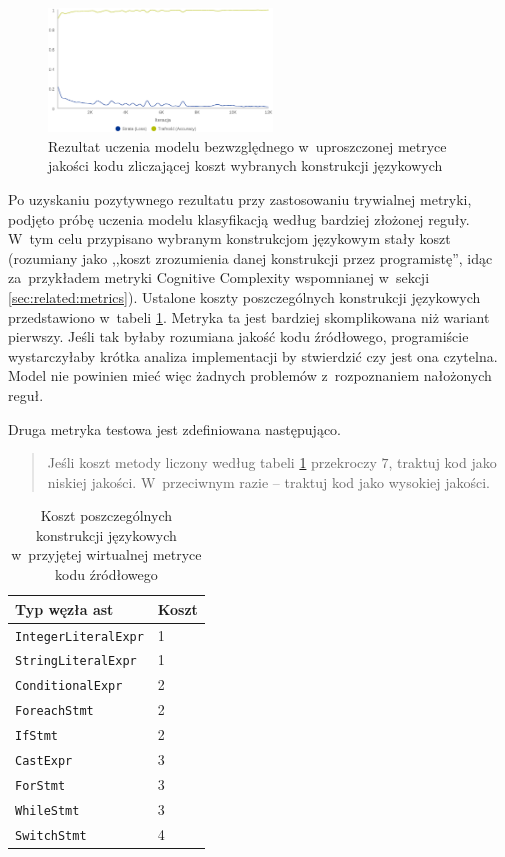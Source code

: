 \documentclass[twoside]{praca}
\begin{document}
\begin{figure}
\centering
\includegraphics[width=0.53\textwidth]{learn/fake-static-7.eps}
\caption{Rezultat uczenia modelu bezwzględnego w~uproszczonej metryce jakości kodu zliczającej koszt wybranych konstrukcji językowych}
\label{fig:learn:fake-static7}
\end{figure}

Po uzyskaniu pozytywnego rezultatu przy zastosowaniu trywialnej metryki, podjęto próbę uczenia modelu klasyfikacją według bardziej złożonej reguły. W~tym celu przypisano wybranym konstrukcjom językowym stały koszt (rozumiany jako ,,koszt zrozumienia danej konstrukcji przez programistę'', idąc za~przykładem metryki Cognitive Complexity \cite{cognitive} wspomnianej w~sekcji \ref{sec:related:metrics}). Ustalone koszty poszczególnych konstrukcji językowych przedstawiono w~tabeli \ref{tbl:learn:fake-cost}. Metryka ta jest bardziej skomplikowana niż wariant pierwszy. Jeśli tak byłaby rozumiana jakość kodu źródłowego, programiście wystarczyłaby krótka analiza implementacji by stwierdzić czy jest ona czytelna. Model nie powinien mieć więc żadnych problemów z~rozpoznaniem nałożonych reguł.

\pagebreak

Druga metryka testowa jest zdefiniowana następująco.

\begin{quotation}
\noindent Jeśli koszt metody liczony według tabeli \ref{tbl:learn:fake-cost} przekroczy $7$, traktuj kod jako niskiej jakości. W~przeciwnym razie -- traktuj kod jako wysokiej jakości.
\end{quotation}

\begin{table}[h]
\centering
\caption{Koszt poszczególnych konstrukcji językowych w~przyjętej wirtualnej metryce kodu źródłowego}
\label{tbl:learn:fake-cost}
\begin{tabular}{|l|l|}
  \hline 
  \textbf{Typ węzła \gls{ast}} & \textbf{Koszt} \\ \hline
  \texttt{IntegerLiteralExpr} & 1 \\ \hline
  \texttt{StringLiteralExpr} & 1 \\ \hline
  \texttt{ConditionalExpr} & 2 \\ \hline
  \texttt{ForeachStmt} & 2 \\ \hline
  \texttt{IfStmt} & 2 \\ \hline
  \texttt{CastExpr} & 3 \\ \hline
  \texttt{ForStmt} & 3 \\ \hline
  \texttt{WhileStmt} & 3 \\ \hline
  \texttt{SwitchStmt} & 4 \\ \hline
\end{tabular} 
\end{table}
\end{document}
